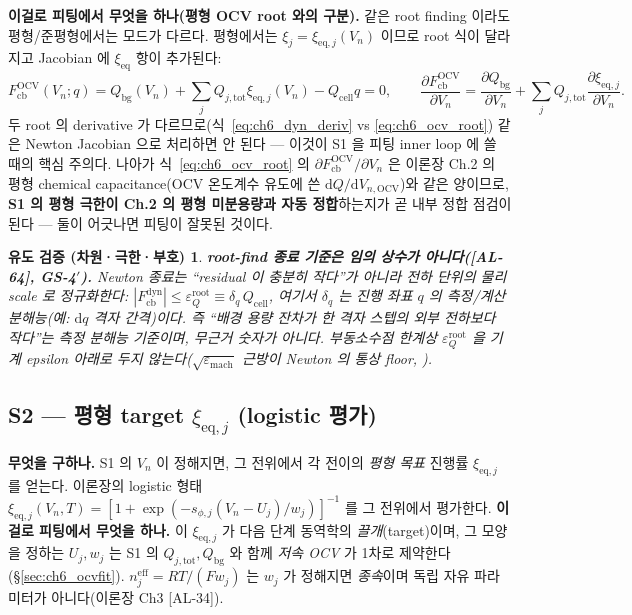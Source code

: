 \documentclass[11pt,a4paper]{article}
\newtheorem*{verifybox}{유도 검증 (차원·극한·부호)}
\newcommand{\dd}{\mathrm{d}}
\newcommand{\eff}{\mathrm{eff}}
\newcommand{\eq}{\mathrm{eq}}
\newcommand{\bg}{\mathrm{bg}}
\newcommand{\cell}{\mathrm{cell}}
\newcommand{\OCV}{\mathrm{OCV}}
\newcommand{\tot}{\mathrm{tot}}
\newcommand{\cb}{\mathrm{cb}}
\newcommand{\dyn}{\mathrm{dyn}}
\newcommand{\AL}[1]{\textsf{[AL-#1]}}
\begin{document}
\textbf{이걸로 피팅에서 무엇을 하나(평형 OCV root 와의 구분).} 같은 root finding 이라도 평형/준평형에서는 모드가
다르다. 평형에서는 $\xi_j=\xi_{\eq,j}(V_n)$ 이므로 root 식이 달라지고 Jacobian 에 $\xi_{\eq}$ 항이 추가된다:
\begin{equation}
F_\cb^\OCV(V_n;q)=Q_\bg(V_n)+\sum_j Q_{j,\tot}\xi_{\eq,j}(V_n)-Q_\cell q=0,\qquad
\frac{\partial F_\cb^\OCV}{\partial V_n}=\frac{\partial Q_\bg}{\partial V_n}+\sum_j Q_{j,\tot}\frac{\partial\xi_{\eq,j}}{\partial V_n}.
\label{eq:ch6_ocv_root}
\end{equation}
두 root 의 derivative 가 다르므로(식~\eqref{eq:ch6_dyn_deriv} vs \eqref{eq:ch6_ocv_root}) 같은 Newton
Jacobian 으로 처리하면 안 된다 — 이것이 S1 을 피팅 inner loop 에 쓸 때의 핵심 주의다. 나아가
식~\eqref{eq:ch6_ocv_root} 의 $\partial F_\cb^\OCV/\partial V_n$ 은 이론장 Ch.2 의 평형 chemical
capacitance(OCV 온도계수 유도에 쓴 $\dd Q/\dd V_{n,\OCV}$)와 같은 양이므로, \textbf{S1 의 평형 극한이 Ch.2 의
평형 미분용량과 자동 정합}하는지가 곧 내부 정합 점검이 된다 — 둘이 어긋나면 피팅이 잘못된 것이다.
\begin{verifybox}
\textbf{root-find 종료 기준은 임의 상수가 아니다(\AL{64}, GS-4$'$).} Newton 종료는 ``residual 이 충분히 작다''가
아니라 \emph{전하 단위의 물리 scale} 로 정규화한다: $|F_\cb^\dyn|\le\varepsilon_Q^{\mathrm{root}}\equiv
\delta_q\,Q_\cell$, 여기서 $\delta_q$ 는 진행 좌표 $q$ 의 측정/계산 분해능(예: $\dd q$ 격자 간격)이다. 즉 ``배경
용량 잔차가 한 격자 스텝의 외부 전하보다 작다''는 \emph{측정 분해능 기준}이며, 무근거 숫자가 아니다. 부동소수점
한계상 $\varepsilon_Q^{\mathrm{root}}$ 을 기계 epsilon 아래로 두지 않는다($\sqrt{\varepsilon_{\mathrm{mach}}}$
근방이 Newton 의 통상 floor, \cite{brenan1996}).
\end{verifybox}

\subsection{S2 — 평형 target $\xi_{\eq,j}$ (logistic 평가)}\label{sec:ch6_S2}
\textbf{무엇을 구하나.} S1 의 $V_n$ 이 정해지면, 그 전위에서 각 전이의 \emph{평형 목표} 진행률 $\xi_{\eq,j}$ 를
얻는다. 이론장의 logistic 형태 $\xi_{\eq,j}(V_n,T)=[1+\exp(-s_{\phi,j}(V_n-U_j)/w_j)]^{-1}$ 를 그 전위에서 평가한다.
\textbf{이걸로 피팅에서 무엇을 하나.} 이 $\xi_{\eq,j}$ 가 다음 단계 동역학의 \emph{끌개}(target)이며, 그 모양을
정하는 $U_j,w_j$ 는 S1 의 $Q_{j,\tot},Q_\bg$ 와 함께 \emph{저속 OCV} 가 1차로 제약한다(\S\ref{sec:ch6_ocvfit}).
$n_j^{\eff}=RT/(Fw_j)$ 는 $w_j$ 가 정해지면 \emph{종속}이며 독립 자유 파라미터가 아니다(이론장 Ch3 \AL{34}).
\end{document}

